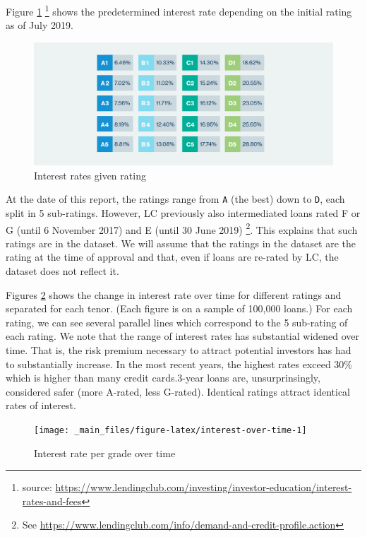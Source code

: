 \documentclass[11pt,]{report}
\let\rmarkdownfootnote\footnote%
\def\footnote{\protect\rmarkdownfootnote}
\begin{document}
Figure \ref{fig:interest-rate-table} \footnote{source: \url{https://www.lendingclub.com/investing/investor-education/interest-rates-and-fees}} shows the predetermined interest rate depending on the initial rating as of July 2019.

\begin{figure}

{\centering \includegraphics[width=0.7\linewidth]{images/interest-rates-jul2019} 

}

\caption{Interest rates given rating}\label{fig:interest-rate-table}
\end{figure}

At the date of this report, the ratings range from \texttt{A} (the best) down to \texttt{D}, each split in 5 sub-ratings. However, LC previously also intermediated loans rated F or G (until 6 November 2017) and E (until 30 June 2019) \footnote{See \url{https://www.lendingclub.com/info/demand-and-credit-profile.action}}. This explains that such ratings are in the dataset. We will assume that the ratings in the dataset are the rating at the time of approval and that, even if loans are re-rated by LC, the dataset does not reflect it.

Figures \ref{fig:interest-over-time} shows the change in interest rate over time for different ratings and separated for each tenor. (Each figure is on a sample of 100,000 loans.) For each rating, we can see several parallel lines which correspond to the 5 sub-rating of each rating. We note that the range of interest rates has substantial widened over time. That is, the risk premium necessary to attract potential investors has had to substantially increase. In the most recent years, the highest rates exceed 30\% which is higher than many credit cards.3-year loans are, unsurprinsingly, considered safer (more A-rated, less G-rated). Identical ratings attract identical rates of interest.

\begin{figure}

{\centering \texttt{[image: \_main\_files/figure-latex/interest-over-time-1]} 

}

\caption{Interest rate per grade over time}\label{fig:interest-over-time}
\end{figure}
\end{document}
